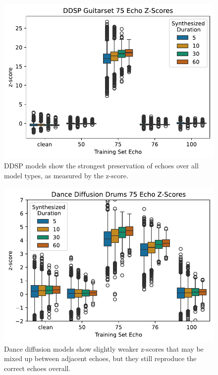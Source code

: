 \documentclass[letterpaper]{article} %
\begin{document}
\begin{figure}
    \centering
    \includegraphics[width=\columnwidth]{figs/DDSPZScoreExamples.pdf}
    \caption{DDSP models show the strongest preservation of echoes over all model types, as measured by the z-score.}
    \label{fig:ddspzscoreexamples}
\end{figure}

\begin{figure}
    \centering
    \includegraphics[width=\columnwidth]{figs/DanceDiffusionZScoreExamples.pdf}
    \caption{Dance diffusion models show slightly weaker z-scores that may be mixed up between adjacent echoes, but they still reproduce the correct echoes overall.}
    \label{fig:dancediffusionzscoreexamples}
\end{figure}
\end{document}
